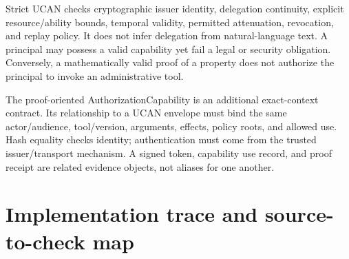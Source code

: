 \documentclass{article}
\begin{document}
Strict UCAN checks cryptographic issuer identity, delegation continuity, explicit resource/ability bounds, temporal validity, permitted attenuation, revocation, and replay policy. It does not infer delegation from natural-language text. A principal may possess a valid capability yet fail a legal or security obligation. Conversely, a mathematically valid proof of a property does not authorize the principal to invoke an administrative tool.

The proof-oriented AuthorizationCapability is an additional exact-context contract. Its relationship to a UCAN envelope must bind the same actor/audience, tool/version, arguments, effects, policy roots, and allowed use. Hash equality checks identity; authentication must come from the trusted issuer/transport mechanism. A signed token, capability use record, and proof receipt are related evidence objects, not aliases for one another.

\section{Implementation trace and source-to-check map}
\end{document}
